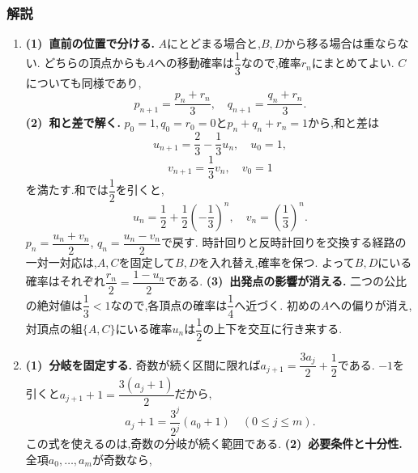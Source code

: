       \subsubsection{解説}\label{節：発展難易度：解法}\label{節：大学過去問ベースのもの：解法}
        \begin{enumerate}[label=\textbf{問\arabic*.},leftmargin=3.8em,format=\bookitemlink{practice-entrance}{solution}{problem}]
          \item \textbf{(1)~直前の位置で分ける.}
                  $A$にとどまる場合と,$B,D$から移る場合は重ならない.
                  どちらの頂点からも$A$への移動確率は$\dfrac{1}{3}$なので,確率$r_n$にまとめてよい.
                  $C$についても同様であり,
                  \[
                    p_{n+1}=\frac{p_n+r_n}3,\quad q_{n+1}=\frac{q_n+r_n}3.
                  \]
                  \smallskip\textbf{(2)~和と差で解く.}
                  $p_0=1,q_0=r_0=0$と$p_n+q_n+r_n=1$から,和と差は
                  \[
                    u_{n+1}=\frac23-\frac13u_n,\quad u_0=1,
                  \]
                  \[
                    v_{n+1}=\frac13v_n,\quad v_0=1
                  \]
                  を満たす.和では$\dfrac{1}{2}$を引くと,
                  \[
                    u_n=\frac12+\frac12\left(-\frac13\right)^n,\quad
                    v_n=\left(\frac13\right)^n.
                  \]
                  $p_n=\dfrac{u_n+v_n}{2}$, $q_n=\dfrac{u_n-v_n}{2}$で戻す.
                  時計回りと反時計回りを交換する経路の一対一対応は,$A,C$を固定して$B,D$を入れ替え,確率を保つ.
                  よって$B,D$にいる確率はそれぞれ$\dfrac{r_n}{2}=\dfrac{1-u_n}{2}$である.
                  \smallskip\textbf{(3)~出発点の影響が消える.}
                  二つの公比の絶対値は$\dfrac{1}{3}<1$なので,各頂点の確率は$\dfrac{1}{4}$へ近づく.
                  初めの$A$への偏りが消え,対頂点の組$\{A,C\}$にいる確率$u_n$は$\dfrac{1}{2}$の上下を交互に行き来する.
          \item \textbf{(1)~分岐を固定する.}
                  奇数が続く区間に限れば$a_{j+1}=\dfrac{3a_j}{2}+\dfrac{1}{2}$である.
                  $-1$を引くと$a_{j+1}+1=\dfrac{3(a_j+1)}{2}$だから,
                  \[
                    a_j+1=\frac{3^j}{2^j}(a_0+1)\quad(0\le j\le m).
                  \]
                  この式を使えるのは,奇数の分岐が続く範囲である.
                  \smallskip\textbf{(2)~必要条件と十分性.}
                  全項$a_0,\ldots,a_m$が奇数なら,
                  \[
\]
\end{enumerate}
